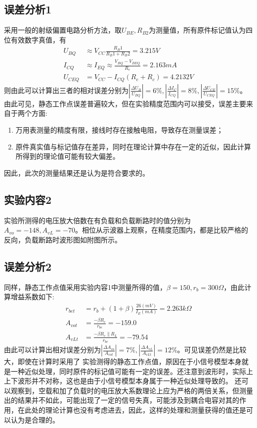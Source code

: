 \documentclass[a4paper,11pt,UTF8]{ctexart}
\begin{document}
\subsection{误差分析1}
  采用一般的射级偏置电路分析方法，取$U_{BE},R_{B2}$为测量值，所有原件标记值认为四位有效数字真值，有
  \begin{equation}
    \begin{aligned}
      U_{BQ}&\approx V_{CC}\frac{R_B1}{R_B1+R_B2}=3.215V\\
      I_{CQ}&\approx I_{EQ}\approx\frac{V_{BQ}-V_{BEQ}}{R_e}=2.163mA\\
      U_{CEQ}&=V_{CC}-I_{CQ}(R_e+R_c)=4.2132V
    \end{aligned}
  \end{equation}
  则由此可以计算出三者的相对误差分别为$\left |\frac{\Delta U_B}{U_{BQ}}\right |=6\%,\left |\frac{\Delta I_C}{I_{CQ}}\right |=8\%,\left |\frac{\Delta U_{CE}}{U_{CEQ}}\right |=15\%$。
  由此可见，静态工作点误差普遍较大，但在实验精度范围内可以接受，误差主要来自于两个方面:
  \begin{enumerate}
    \item 万用表测量的精度有限，接线时存在接触电阻，导致存在测量误差；
    \item 原件真实值与标记值存在差异，同时在理论计算中存在一定的近似，因此计算所得到的理论值可能有较大偏差。
  \end{enumerate}
  因此，此次的测量结果还是认为是符合要求的。
  \subsection{实验内容2}
  实验所测得的电压放大倍数在有负载和负载断路时的值分别为$A_{vo}=-148,A_{vL}=-70$。相位从示波器上观察，在精度范围内，都是比较严格的反向，负载断路时波形图如附图所示。
  \subsection{误差分析2}
  同样，静态工作点值采用实验内容1中测量所得的值，$\beta=150,r_b=300\Omega$，由此计算增益系数如下:
  \begin{equation}
    \begin{aligned}
      r_{bet}&=r_{b}+(1+\beta) \frac{26(mV)}{I_E(mA)}=2.263k\Omega\\
      A_{vot}&=\frac{-\beta R_{c}}{r_{be}}=-159.0\\
      A_{vLt}&=\frac{-\beta R_{c}\parallel R_{L}}{r_{be}}=-79.54
    \end{aligned}
  \end{equation}
  由此可以计算出相对误差分别为$\left |\frac{\Delta A_{vo}}{A_{vot}}\right |=7\%,\left |\frac{\Delta A_{vL}}{A_{vLt}}\right |=12\%$。可见误差仍然是比较大，即使在计算时采用了
  实验测得的静态工作点值，原因在于小信号模型本身就是一种近似处理，同时原件的标记值可能有一定的误差。还注意到波形时，实际上上下波形并不对称，这也是由于小信号模型本身属于一种近似处理导致的。
  还可以观察到，空载和加了负载时的电压放大系数理论上应为严格的两倍关系，但测量出的结果并不如此，可能出现了一定的信号失真，可能涉及到耦合电容对其的作用，在此处的理论计算也没有考虑进去，因此，这样的处理和测量获得的值还是可以认为是合理的。
\end{document}
